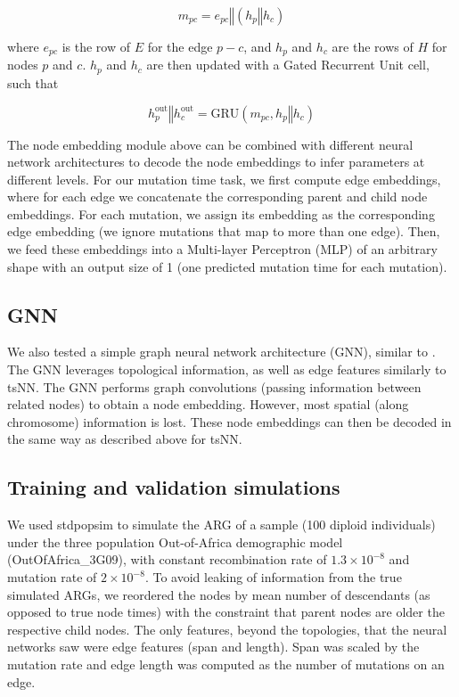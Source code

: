 $$ m_{pc} = e_{pc} \mathbin\Vert (h_p \mathbin\Vert h_c)$$

where $e_{pc}$ is the row of $E$ for the edge $p-c$, and $h_p$ and $h_c$ are the rows of $H$ for nodes $p$ and $c$.
$h_p$ and $h_c$ are then updated with a Gated Recurrent Unit cell, such that

$$ h^{\mathrm{out}}_p \mathbin\Vert h^{\mathrm{out}}_c = \mathrm{GRU}(m_{pc}, h_p \mathbin\Vert h_c)$$

The node embedding module above can be combined with different neural network architectures to decode the node embeddings to infer parameters at different levels.
For our mutation time task, we first compute edge embeddings,
where for each edge we concatenate the corresponding parent and child node embeddings.
For each mutation, we assign its embedding as the corresponding edge embedding (we ignore mutations that map to more than one edge).
Then, we feed these embeddings into a Multi-layer Perceptron (MLP) of an arbitrary shape with an output size of 1 (one predicted mutation time for each mutation).

\subsection{GNN}

We also tested a simple graph neural network architecture (GNN), similar to \citet{korfmann_simultaneous_2023}.
The GNN leverages topological information, as well as edge features similarly to tsNN.
The GNN performs graph convolutions (passing information between related nodes) to obtain a node embedding.
However, most spatial (along chromosome) information is lost.
These node embeddings can then be decoded in the same way as described above for tsNN.

\subsection{Training and validation simulations}

We used stdpopsim to simulate the ARG of a sample (100 diploid individuals) under the three population Out-of-Africa demographic model (OutOfAfrica\_3G09),
with constant recombination rate of $1.3 \times 10^{-8}$ and mutation rate of $2 \times 10^{-8}$.
To avoid leaking of information from the true simulated ARGs,
we reordered the nodes by mean number of descendants (as opposed to true node times) with the constraint that parent nodes are older the respective child nodes.
The only features, beyond the topologies, that the neural networks saw were edge features (span and length).
Span was scaled by the mutation rate and edge length was computed as the number of mutations on an edge.

